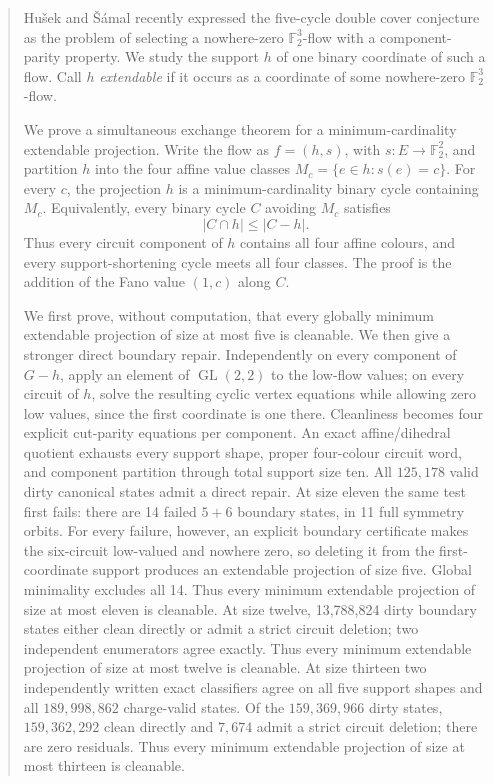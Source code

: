 \documentclass[11pt]{article}
\theoremstyle{definition}
\theoremstyle{remark}
\newcommand{\F}{\mathbb F}
\begin{document}
\begin{abstract}
Hu\v{s}ek and \v{S}\'amal recently expressed the five-cycle double cover
conjecture as the problem of selecting a nowhere-zero
\(\F_2^3\)-flow with a component-parity property.  We study the support
\(h\) of one binary coordinate of such a flow.  Call \(h\)
\emph{extendable} if it occurs as a coordinate of some nowhere-zero
\(\F_2^3\)-flow.

We prove a simultaneous exchange theorem for a minimum-cardinality
extendable projection.  Write the flow as \(f=(h,s)\), with
\(s:E\to\F_2^2\), and partition \(h\) into the four affine value classes
\(M_c=\{e\in h:s(e)=c\}\).  For every \(c\), the projection \(h\) is a
minimum-cardinality binary cycle containing \(M_c\).  Equivalently, every
binary cycle \(C\) avoiding \(M_c\) satisfies
\[
                         |C\cap h|\le |C-h|.
\]
Thus every circuit component of \(h\) contains all four affine colours,
and every support-shortening cycle meets all four classes.  The proof is
the addition of the Fano value \((1,c)\) along \(C\).

We first prove, without computation, that every globally minimum
extendable projection of size at most five is cleanable.  We then give a
stronger direct boundary repair.  Independently on every component of
\(G-h\), apply an element of \(\operatorname{GL}(2,2)\) to the low-flow
values; on every circuit of \(h\), solve the resulting cyclic vertex
equations while allowing zero low values, since the first coordinate is
one there.  Cleanliness becomes four explicit cut-parity equations per
component.  An exact affine/dihedral quotient exhausts every support shape,
proper four-colour circuit word, and component partition through total
support size ten.  All \(125{,}178\) valid dirty canonical states admit a
direct repair.  At size eleven the same test first fails: there are
14 failed \(5+6\) boundary states, in 11 full symmetry orbits.  For every
failure, however, an explicit boundary certificate makes the six-circuit
low-valued and nowhere zero, so deleting it from the first-coordinate
support produces an extendable projection of size five.  Global minimality
excludes all 14.  Thus every minimum extendable projection of size at most
eleven is cleanable.  At size twelve, 13,788,824 dirty boundary states
either clean directly or admit a strict circuit deletion; two independent
enumerators agree exactly.  Thus every minimum extendable projection of
size at most twelve is cleanable.  At size thirteen two independently
written exact classifiers agree on all five support shapes and all
\(189{,}998{,}862\) charge-valid states.  Of the \(159{,}369{,}966\)
dirty states, \(159{,}362{,}292\) clean directly and \(7{,}674\) admit
a strict circuit deletion; there are zero residuals.  Thus every minimum
extendable projection of size at most thirteen is cleanable.


\end{abstract}
\end{document}
